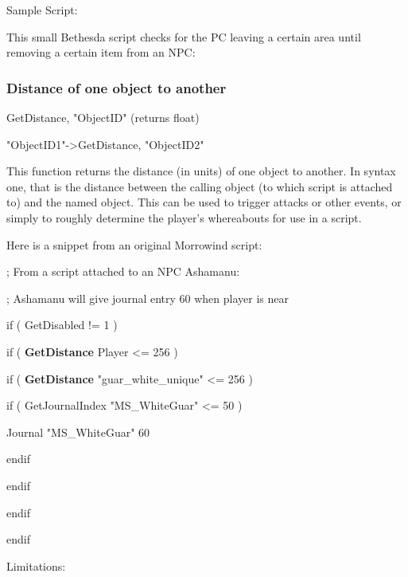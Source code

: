 \documentclass[
]{article}
\begin{document}
Sample Script:

This small Bethesda script checks for the PC leaving a certain area
until removing a certain item from an NPC:



\hypertarget{distance-of-one-object-to-another}{%
\subsubsection{Distance of one object to
another}\label{distance-of-one-object-to-another}}

GetDistance, "ObjectID" (returns float)

"ObjectID1"-\textgreater GetDistance, "ObjectID2"

This function returns the distance (in units) of one object to another.
In syntax one, that is the distance between the calling object (to which
script is attached to) and the named object. This can be used to trigger
attacks or other events, or simply to roughly determine the player's
whereabouts for use in a script.

Here is a snippet from an original Morrowind script:

; From a script attached to an NPC Ashamanu:

; Ashamanu will give journal entry 60 when player is near

if ( GetDisabled != 1 )

if ( \textbf{GetDistance} Player \textless= 256 )

if ( \textbf{GetDistance} "guar\_white\_unique" \textless= 256 )

if ( GetJournalIndex "MS\_WhiteGuar" \textless= 50 )

Journal "MS\_WhiteGuar" 60

endif

endif

endif

endif

Limitations:
\end{document}
